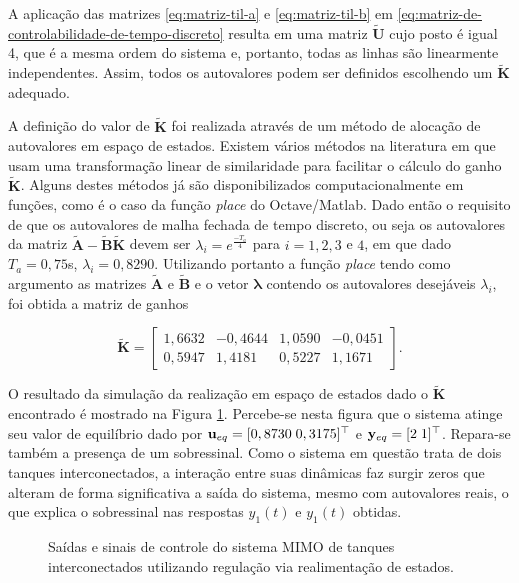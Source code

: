 A aplicação das matrizes \ref{eq:matriz-til-a} e \ref{eq:matriz-til-b} em
\ref{eq:matriz-de-controlabilidade-de-tempo-discreto} resulta em uma matriz
$\mathbf{\tilde{U}}$ cujo posto é igual 4, que é a mesma ordem do sistema e,
portanto, todas as linhas são linearmente independentes. Assim, todos os
autovalores podem ser definidos escolhendo um $\mathbf{\tilde{K}}$ adequado.

A definição do valor de $\mathbf{\tilde{K}}$ foi realizada através de um método
de alocação de autovalores em espaço de estados. Existem vários métodos na
literatura em que usam uma transformação linear de similaridade para facilitar o
cálculo do ganho $\mathbf{\tilde{K}}$. Alguns destes métodos já são
disponibilizados computacionalmente em funções, como é o caso da função
\textit{place} do Octave/Matlab. Dado então o requisito de que os autovalores de
malha fechada de tempo discreto, ou seja os autovalores da matriz
$\mathbf{\tilde{A} - \tilde{B}\tilde{K}}$ devem ser $\lambda_i =
e^{\frac{-T_a}{4}}$ para $i = 1, 2, 3$ e $4$, em que dado $T_a = 0,75$s,
$\lambda_i = 0,8290$. Utilizando portanto a função \textit{place} tendo como
argumento as matrizes $\mathbf{\tilde{A}}$ e $\mathbf{\tilde{B}}$ e o vetor
$\mathbf{\lambda}$ contendo os autovalores desejáveis $\lambda_i$, foi obtida a
matriz de ganhos

\begin{equation}
    \label{eq:matriz-de-ganhos-discreto}
    \mathbf{\tilde{K}} = 
    \begin{bmatrix}
        1,6632 & -0,4644 & 1,0590 & -0,0451    \\
        0,5947 & 1,4181 &  0,5227 & 1,1671
    \end{bmatrix}.
\end{equation}

O resultado da simulação da realização em espaço de estados dado o
$\mathbf{\tilde{K}}$ encontrado é mostrado na Figura
\ref{fig:resultado-do-regulador-via-realimentacao-de-estados}. Percebe-se nesta
figura que o sistema atinge seu valor de equilíbrio dado por $\mathbf{u}_{eq} =
[0,8730 \thickspace 0,3175]^\top$ e $\mathbf{y}_{eq} = [2 \thickspace 1]^\top$.
Repara-se também a presença de um sobressinal. Como o sistema em questão trata
de dois tanques interconectados, a interação entre suas dinâmicas faz surgir
zeros que alteram de forma significativa a saída do sistema, mesmo com
autovalores reais, o que explica o sobressinal nas respostas $y_1(t)$ e $y_1(t)$
obtidas.

\begin{figure}[!htp]
    \caption{Saídas e sinais de controle do sistema MIMO de tanques
    interconectados utilizando regulação via realimentação de estados.}
    \vspace{-10pt}
    \hspace{-30pt}
    \label{fig:resultado-do-regulador-via-realimentacao-de-estados}
    \begin{minipage}{\linewidth}
        
    \end{minipage}
\end{figure}

